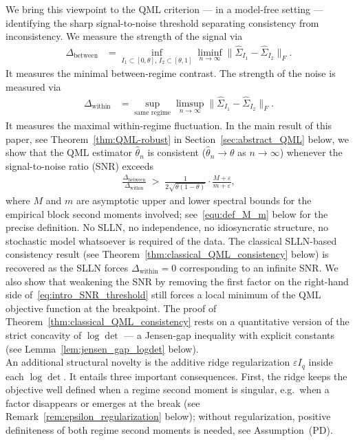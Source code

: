 \documentclass[10pt, letterpaper]{amsart}
\begin{document}
We bring this viewpoint to the QML criterion --- in a model-free setting --- identifying the sharp signal-to-noise threshold separating consistency from inconsistency. We measure the strength of the signal via
\begin{align}
\Delta_{\text{between}} & = \inf_{I_1\subset[0,\theta],\,I_2\subset[\theta,1]}\liminf_{n\to\infty}\bigl\|\widehat\Sigma_{I_1}-\widehat\Sigma_{I_2}\bigr\|_F.
\end{align}
It measures the minimal between-regime contrast. The strength of the noise is measured via
\begin{align}\label{equ:SNR_introduction}
  \Delta_{\text{within}} & = \sup_{\text{same regime}}\limsup_{n\to\infty}\bigl\|\widehat\Sigma_{I_1}-\widehat\Sigma_{I_2}\bigr\|_F.
\end{align}
It measures the maximal within-regime fluctuation. In the main result of this paper, see Theorem~\ref{thm:QML-robust} in Section~\ref{sec:abstract_QML} below, we show that the QML estimator $\hat\theta_n$ is consistent ($\hat\theta_n\to\theta$ as $n\to\infty$) whenever the signal-to-noise ratio (SNR) exceeds
\begin{align}\label{eq:intro_SNR_threshold}
\frac{\Delta_{\text{between}}}{\Delta_{\text{within}}} \;>\; \frac{1}{2\sqrt{\theta(1-\theta)}}\cdot\frac{M+\varepsilon}{m+\varepsilon},
\end{align}
where $M$ and $m$ are asymptotic upper and lower spectral bounds for the empirical block second moments involved; see~\eqref{equ:def_M_m} below for the precise definition. No SLLN, no independence, no idiosyncratic structure, no stochastic model whatsoever is required of the data.
The classical SLLN-based consistency result (see Theorem~\ref{thm:classical_QML_consistency} below) is recovered as the SLLN forces $\Delta_{\text{within}}=0$ corresponding to an infinite SNR. We also show that weakening the SNR by removing the first factor on the right-hand side of~\eqref{eq:intro_SNR_threshold} still forces a local minimum of the QML objective function at the breakpoint. The proof of Theorem~\ref{thm:classical_QML_consistency} rests on a quantitative version of the strict concavity of $\log\det$ --- a Jensen-gap inequality with explicit constants (see Lemma~\ref{lem:jensen_gap_logdet} below).
\\

  An additional structural novelty is the additive ridge regularization $\varepsilon I_q$ inside each $\log\det$. It entails three important consequences.  First, the ridge keeps the objective well defined when a regime second moment is singular, e.g.\ when a factor disappears or emerges at the break (see Remark~\ref{rem:epsilon_regularization} below); without regularization, positive definiteness of both regime second moments is needed, see Assumption~(PD).
\end{document}
